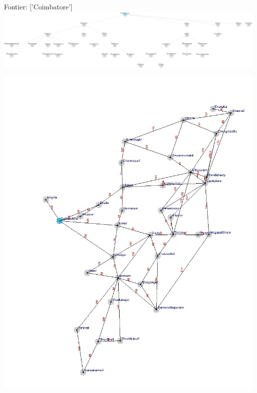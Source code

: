 \documentclass[xcolor=table]{beamer}
\begin{document}
\begin{frame}
  { \tiny Fontier: ['Coimbatore'] }
  \includegraphics[width=1\textwidth]{../BFSNodes/2-1.png}
  \begin{center}
    \includegraphics[height=0.6\textheight]{../BFSoutput/tamilBFS0.jpg}
  \end{center}
\end{frame}
\end{document}
